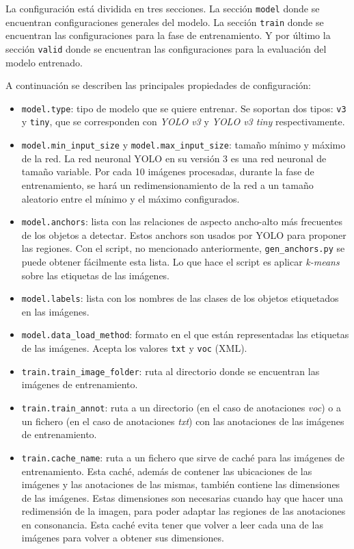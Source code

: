 La configuración está dividida en tres secciones. La sección \texttt{model} donde se encuentran configuraciones generales del modelo. La sección \texttt{train} donde se encuentran las configuraciones para la fase de entrenamiento. Y por último la sección \texttt{valid} donde se encuentran las configuraciones para la evaluación del modelo entrenado.

A continuación se describen las principales propiedades de configuración:

\begin{itemize}
	\item \texttt{model.type}: tipo de modelo que se quiere entrenar. Se soportan dos tipos: \texttt{v3} y \texttt{tiny}, que se corresponden con \textit{YOLO v3} y \textit{YOLO v3 tiny} respectivamente.
	\item \texttt{model.min\_input\_size} y \texttt{model.max\_input\_size}: tamaño mínimo y máximo de la red. La red neuronal YOLO en su versión 3 es una red neuronal de tamaño variable. Por cada 10 imágenes procesadas, durante la fase de entrenamiento, se hará un redimensionamiento de la red a un tamaño aleatorio entre el mínimo y el máximo configurados.
	\item \texttt{model.anchors}: lista con las relaciones de aspecto ancho-alto más frecuentes de los objetos a detectar. Estos anchors son usados por YOLO para proponer las regiones. Con el script, no mencionado anteriormente,  \texttt{gen\_anchors.py} se puede obtener fácilmente esta lista. Lo que hace el script es aplicar \textit{k-means} sobre las etiquetas de las imágenes.
	\item \texttt{model.labels}: lista con los nombres de las clases de los objetos etiquetados en las imágenes.
	\item \texttt{model.data\_load\_method}: formato en el que están representadas las etiquetas de las imágenes. Acepta los valores \texttt{txt} y \texttt{voc} (XML).
	\item \texttt{train.train\_image\_folder}: ruta al directorio donde se encuentran las imágenes de entrenamiento.
	\item \texttt{train.train\_annot}: ruta a un directorio (en el caso de anotaciones \textit{voc}) o a un fichero (en el caso de anotaciones \textit{txt}) con las anotaciones de las imágenes de entrenamiento.
	\item \texttt{train.cache\_name}: ruta a un fichero que sirve de caché para las imágenes de entrenamiento. Esta caché, además de contener las ubicaciones de las imágenes y las anotaciones de las mismas, también contiene las dimensiones de las imágenes. Estas dimensiones son necesarias cuando hay que hacer una redimensión de la imagen, para poder adaptar las regiones de las anotaciones en consonancia. Esta caché evita tener que volver a leer cada una de las imágenes para volver a obtener sus dimensiones.

\end{itemize}
